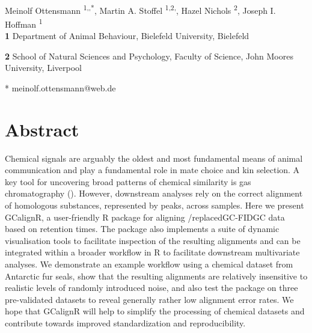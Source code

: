 \documentclass[10pt,letterpaper]{article}
\date{}
\begin{document}
\vspace*{0.2in}
\def\code#1{\texttt{#1}}
\begin{flushleft}
{\Large
\textbf{} 
}
\newline
\\
Meinolf Ottensmann \textsuperscript{1,\added{\Yinyang},*},
Martin A. Stoffel \textsuperscript{1,2,\added{\Yinyang}},
Hazel Nichols \textsuperscript{2},
Joseph I. Hoffman \textsuperscript{1}
\\
\bigskip
\textbf{1} Department of Animal Behaviour, Bielefeld University, Bielefeld

\textbf{2} School of Natural Sciences and Psychology, Faculty of Science, John Moores University, Liverpool
\\
\bigskip


* meinolf.ottensmann@web.de


\end{flushleft}
\section*{Abstract}
Chemical signals are arguably the oldest and most fundamental means of animal communication and play a fundamental role in mate choice and kin selection. A key tool for uncovering broad patterns of chemical similarity is gas chromatography  (). However, downstream analyses rely on the correct alignment of homologous substances, represented by peaks, across samples. Here we present GCalignR, a user-friendly R package for aligning /replaced{GC-FID}{GC} data based on retention times. The package also implements a suite of dynamic visualisation tools to facilitate inspection of the resulting alignments and can be integrated within a broader workflow in R to facilitate downstream multivariate analyses. We demonstrate an example workflow using a chemical dataset from Antarctic fur seals, show that the resulting alignments are relatively insensitive to realistic levels of randomly introduced noise, and also test the package on three pre-validated datasets to reveal generally rather low alignment error rates. We hope that GCalignR will help to simplify the processing of chemical datasets and contribute towards improved standardization and reproducibility.
\linenumbers
\end{document}

